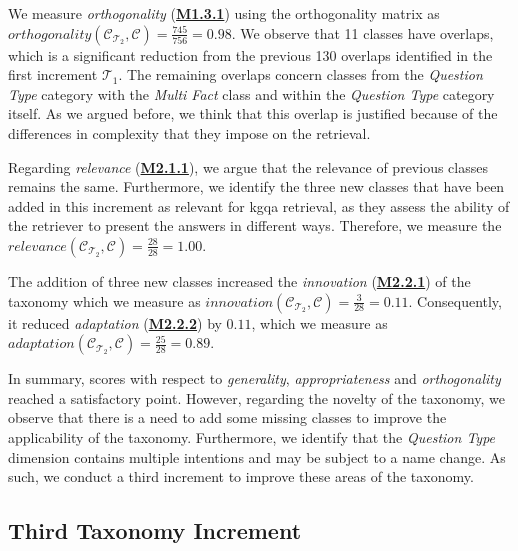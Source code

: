 \begin{sloppypar}
    We measure \emph{orthogonality} (\hyperref[tab:gqm_taxonomy_validation]{\textbf{M1.3.1}}) using the orthogonality matrix as $orthogonality(\mathcal{C}_{\mathcal{T}_2}, \mathcal{C}) = \frac{745}{756} = 0.98$. We observe that 11 classes have overlaps, which is a significant reduction from the previous 130 overlaps identified in the first increment $\mathcal{T}_1$. The remaining overlaps concern classes from the \emph{Question Type} category with the \emph{Multi Fact} class and within the \emph{Question Type} category itself. As we argued before, we think that this overlap is justified because of the differences in complexity that they impose on the retrieval.
\end{sloppypar}

\begin{sloppypar}
    Regarding \emph{relevance} (\hyperref[tab:gqm_taxonomy_validation]{\textbf{M2.1.1}}), we argue that the relevance of previous classes remains the same. Furthermore, we identify the three new classes that have been added in this increment as relevant for \gls{kgqa} retrieval, as they assess the ability of the retriever to present the answers in different ways. Therefore, we measure the $relevance(\mathcal{C}_{\mathcal{T}_2}, \mathcal{C}) = \frac{28}{28} = 1.00$.
\end{sloppypar}

\begin{sloppypar}
    The addition of three new classes increased the \emph{innovation} (\hyperref[tab:gqm_taxonomy_validation]{\textbf{M2.2.1}}) of the taxonomy which we measure as $innovation(\mathcal{C}_{\mathcal{T}_2}, \mathcal{C}) = \frac{3}{28} = 0.11$. Consequently, it reduced \emph{adaptation} (\hyperref[tab:gqm_taxonomy_validation]{\textbf{M2.2.2}}) by $0.11$, which we measure as $adaptation(\mathcal{C}_{\mathcal{T}_2}, \mathcal{C}) = \frac{25}{28} = 0.89$.
\end{sloppypar}

In summary, scores with respect to \emph{generality}, \emph{appropriateness} and \emph{orthogonality} reached a satisfactory point. However, regarding the novelty of the taxonomy, we observe that there is a need to add some missing classes to improve the applicability of the taxonomy. Furthermore, we identify that the \emph{Question Type} dimension contains multiple intentions and may be subject to a name change. As such, we conduct a third increment to improve these areas of the taxonomy.

\subsection{Third Taxonomy Increment}

